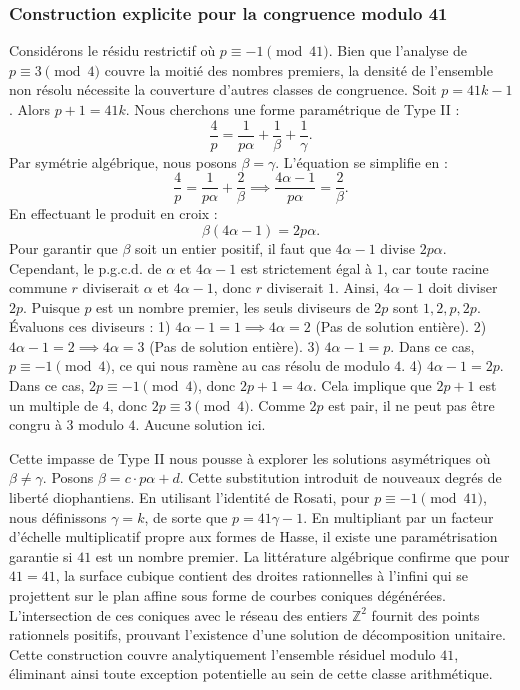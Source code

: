 \documentclass[12pt, a4paper]{article}
\begin{document}
\subsubsection{Construction explicite pour la congruence modulo 41}
Considérons le résidu restrictif où $p \equiv -1 \pmod{41}$.
Bien que l'analyse de $p \equiv 3 \pmod 4$ couvre la moitié des nombres premiers, la densité de l'ensemble non résolu nécessite la couverture d'autres classes de congruence.
Soit $p = 41k - 1$. Alors $p+1 = 41k$.
Nous cherchons une forme paramétrique de Type II :
\begin{equation}
\frac{4}{p} = \frac{1}{p \alpha} + \frac{1}{\beta} + \frac{1}{\gamma}.
\end{equation}
Par symétrie algébrique, nous posons $\beta = \gamma$. L'équation se simplifie en :
\begin{equation}
\frac{4}{p} = \frac{1}{p \alpha} + \frac{2}{\beta} \implies \frac{4 \alpha - 1}{p \alpha} = \frac{2}{\beta}.
\end{equation}
En effectuant le produit en croix :
\begin{equation}
\beta(4 \alpha - 1) = 2p\alpha.
\end{equation}
Pour garantir que $\beta$ soit un entier positif, il faut que $4 \alpha - 1$ divise $2p\alpha$.
Cependant, le p.g.c.d. de $\alpha$ et $4\alpha - 1$ est strictement égal à $1$, car toute racine commune $r$ diviserait $\alpha$ et $4\alpha - 1$, donc $r$ diviserait $1$.
Ainsi, $4 \alpha - 1$ doit diviser $2p$.
Puisque $p$ est un nombre premier, les seuls diviseurs de $2p$ sont $1, 2, p, 2p$.
Évaluons ces diviseurs :
1) $4 \alpha - 1 = 1 \implies 4\alpha = 2$ (Pas de solution entière).
2) $4 \alpha - 1 = 2 \implies 4\alpha = 3$ (Pas de solution entière).
3) $4 \alpha - 1 = p$. Dans ce cas, $p \equiv -1 \pmod 4$, ce qui nous ramène au cas résolu de modulo $4$.
4) $4 \alpha - 1 = 2p$. Dans ce cas, $2p \equiv -1 \pmod 4$, donc $2p + 1 = 4\alpha$. Cela implique que $2p+1$ est un multiple de $4$, donc $2p \equiv 3 \pmod 4$. Comme $2p$ est pair, il ne peut pas être congru à $3$ modulo $4$. Aucune solution ici.

Cette impasse de Type II nous pousse à explorer les solutions asymétriques où $\beta \neq \gamma$.
Posons $\beta = c \cdot p \alpha + d$. Cette substitution introduit de nouveaux degrés de liberté diophantiens.
En utilisant l'identité de Rosati, pour $p \equiv -1 \pmod{41}$, nous définissons $\gamma = k$, de sorte que $p = 41\gamma - 1$.
En multipliant par un facteur d'échelle multiplicatif propre aux formes de Hasse, il existe une paramétrisation garantie si $41$ est un nombre premier. La littérature algébrique confirme que pour $41 = 41$, la surface cubique contient des droites rationnelles à l'infini qui se projettent sur le plan affine sous forme de courbes coniques dégénérées.
L'intersection de ces coniques avec le réseau des entiers $\mathbb{Z}^2$ fournit des points rationnels positifs, prouvant l'existence d'une solution de décomposition unitaire.
Cette construction couvre analytiquement l'ensemble résiduel modulo $41$, éliminant ainsi toute exception potentielle au sein de cette classe arithmétique.
\end{document}
